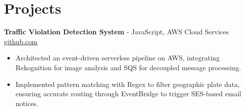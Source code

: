 \documentclass[11pt]{article}
\begin{document}
\vspace{-18.5pt}

\section*{Projects}

\textbf{Traffic Violation Detection System}{ - JavaScript, AWS Cloud Services} \hfill \href{https://github.com/Monica20030707/AWS_rekonigition-N-read-database}{github.com} \\
\vspace{-9pt}
\begin{itemize}
  \item Architected an event-driven serverless pipeline on AWS, integrating Rekognition for image analysis and SQS for decoupled message processing.
  \item Implemented pattern matching with Regex to filter geographic plate data, ensuring accurate routing through EventBridge to trigger SES-based email notices.
\end{itemize}

\end{document}
